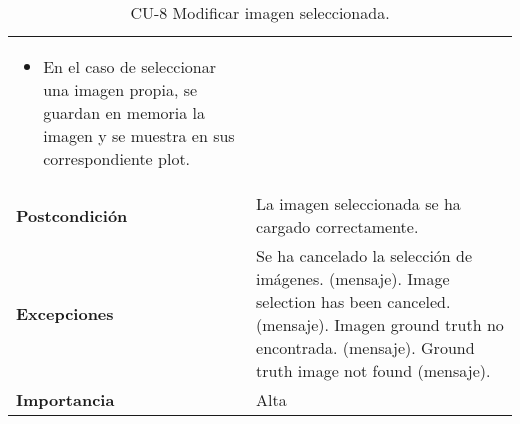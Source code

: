 \begin{table}[p]
\begin{tabularx}{\linewidth}{ p{} p{} }
\begin{enumerate}
\begin{itemize}
                \item En el caso de seleccionar una imagen propia, se guardan en memoria la imagen y se muestra en sus correspondiente plot.
            \end{itemize}
		\end{enumerate}\\
		\textbf{Postcondición}        & La imagen seleccionada se ha cargado correctamente. \\
		\textbf{Excepciones}          & Se ha cancelado la selección de imágenes. (mensaje).\newline
                                        Image selection has been canceled. (mensaje).\newline
                                        Imagen ground truth no encontrada. (mensaje).\newline
                                        Ground truth image not found (mensaje).\\
		\textbf{Importancia}          & Alta \\
		\bottomrule
	\end{tabularx}
	\caption{CU-8 Modificar imagen seleccionada.}
\end{table}

